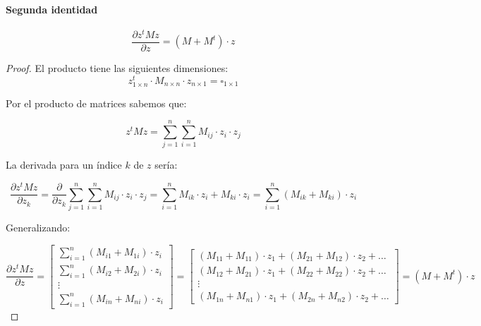 \documentclass[11pt]{scrartcl}
\begin{document}
\paragraph{Segunda identidad}

$$
\frac{\partial z^t M z}{\partial z} = (M + M^t) \cdot z
$$

\begin{proof}

El producto tiene las siguientes dimensiones:
\[
z^t_{1 \times n} \cdot M_{n \times n} \cdot z_{n \times 1} = \square_{1 \times 1}
\]

Por el producto de matrices sabemos que:

\[
z^t M z = \sum_{j=1}^n \sum_{i=1}^n M_{ij} \cdot z_i \cdot z_j
\]

La derivada para un índice $k$ de $z$ sería:

\[
\frac{\partial z^t M z}{\partial z_k} = \frac{\partial}{\partial z_k} \sum_{j=1}^n \sum_{i=1}^n M_{ij} \cdot z_i \cdot z_j =
\sum_{i=1}^n M_{ik} \cdot z_i + M_{ki} \cdot z_i = \sum_{i=1}^n ( M_{ik} + M_{ki} ) \cdot z_i
\]

Generalizando:

\[
\frac{\partial z^t M z}{\partial z} =
\begin{bmatrix}
  \sum_{i=1}^n ( M_{i1} + M_{1i} ) \cdot z_i \\
  \sum_{i=1}^n ( M_{i2} + M_{2i} ) \cdot z_i \\
  \vdots \\
  \sum_{i=1}^n ( M_{in} + M_{ni} ) \cdot z_i
\end{bmatrix}
=
\begin{bmatrix}
  (M_{11} + M_{11}) \cdot z_1 + (M_{21} + M_{12}) \cdot z_2 + \dots \\
  (M_{12} + M_{21}) \cdot z_1 + (M_{22} + M_{22}) \cdot z_2 + \dots \\
  \vdots \\
  (M_{1n} + M_{n1}) \cdot z_1 + (M_{2n} + M_{n2}) \cdot z_2 + \dots 
\end{bmatrix}
=
(M + M^t) \cdot z
\]






\end{proof}
\end{document}
